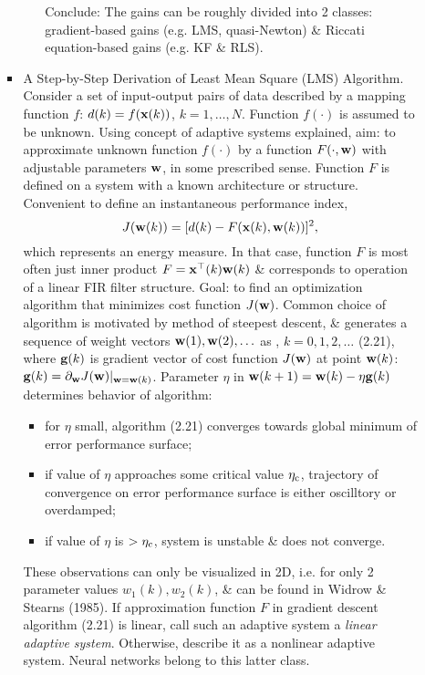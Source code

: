 \documentclass{article}
\begin{document}
\begin{enumerate}
\begin{itemize}
\begin{itemize}
\begin{itemize}
				Conclude:  The gains can be roughly divided into 2 classes: gradient-based gains (e.g. LMS, quasi-Newton) \& Riccati equation-based gains (e.g. KF \& RLS).
			\end{itemize}
			\item {\sf A Step-by-Step Derivation of Least Mean Square (LMS) Algorithm.} Consider a set of input-output pairs of data described by a mapping function $f$: $d(k) = f({\bf x}(k))$, $k = 1,\ldots,N$. Function $f(\cdot)$ is assumed to be unknown. Using concept of adaptive systems explained, aim: to approximate unknown function $f(\cdot)$ by a function $F(\cdot,{\bf w})$ with adjustable parameters ${\bf w}$, in some prescribed sense. Function $F$ is defined on a system with a known architecture or structure. Convenient to define an instantaneous performance index,
			\begin{equation}
				J({\bf w}(k)) = [d(k) - F({\bf x}(k),{\bf w}(k))]^2,
			\end{equation}
			which represents an energy measure. In that case, function $F$ is most often just inner product $F = {\bf x}^\top(k){\bf w}(k)$ \& corresponds to operation of a linear FIR filter structure. Goal: to find an optimization algorithm that minimizes cost function $J({\bf w})$. Common choice of algorithm is motivated by method of steepest descent, \& generates a sequence of weight vectors ${\bf w}(1),{\bf w}(2),\ldots$ as , $k = 0,1,2,\ldots$ (2.21), where ${\bf g}(k)$ is gradient vector of cost function $J({\bf w})$ at point ${\bf w}(k)$: ${\bf g}(k) = \partial_{\bf w}J({\bf w})|_{{\bf w} = {\bf w}(k)}$. Parameter $\eta$ in ${\bf w}(k + 1) = {\bf w}(k) - \eta{\bf g}(k)$ determines behavior of algorithm:
			\begin{itemize}
				\item for $\eta$ small, algorithm (2.21) converges towards global minimum of error performance surface;
				\item if value of $\eta$ approaches some critical value $\eta_{\rm c}$, trajectory of convergence on error performance surface is either oscilltory or overdamped;
				\item if value of $\eta$ is $> \eta_{\rm c}$, system is unstable \& does not converge.
			\end{itemize}
			These observations can only be visualized in 2D, i.e. for only 2 parameter values $w_1(k),w_2(k)$, \& can be found in Widrow \& Stearns (1985). If approximation function $F$ in gradient descent algorithm (2.21) is linear, call such an adaptive system a {\it linear adaptive system}. Otherwise, describe it as a nonlinear adaptive system. Neural networks belong to this latter class.

\end{itemize}
\end{itemize}
\end{enumerate}
\end{document}
